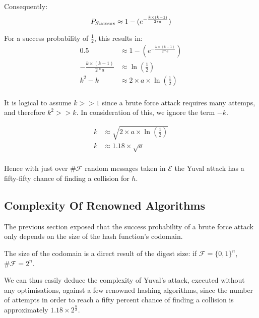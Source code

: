 Consequently:
\begin{equation}
  P_{Success} \approx 1 - (e^{-\frac{k\times (k-1)}{2*a}}) \\
\end{equation}

For a success probability of $\frac{1}{2}$, this results in:
\begin{equation}
  \begin{aligned}
  0.5 & \approx 1 - (e^{-\frac{k\times (k-1)}{2*a}}) \\
  -\frac{k\times (k-1)}{2*a} & \approx \ln(\frac{1}{2}) \\
  k^2 -k & \approx 2 \times a \times \ln(\frac{1}{2}) \\
  \end{aligned}
\end{equation}

It is logical to assume $k>>1$ since a brute force attack requires many attemps, and therefore $k^2>>k$. In consideration of this, we ignore the term $-k$.

\begin{equation}
  \begin{aligned}
  k & \approx \sqrt{2 \times a \times \ln(\frac{1}{2})} \\
  k & \approx 1.18 \times \sqrt{a}\\
  \end{aligned}
\end{equation}

Hence with just over $\#  \mathcal{F} $ random messages taken in $\mathcal{E}$ the Yuval attack has a fifty-fifty chance of finding a collision for $h$.

\subsection{Complexity Of Renowned Algorithms}
The previous section exposed that the success probability of a brute force attack only depends on the size of the hash function's codomain.

The size of the codomain is a direct result of the digest size: if $\mathcal{F} = {\{ 0,1\}}^n$, $\#  \mathcal{F} = 2^n$.

We can thus easily deduce the complexity of Yuval's attack, executed without any optimisations, against a few renowned hashing algorithms, since the number of attempts in order to reach a fifty percent chance of finding a collision is approximately $1.18 \times 2^{\frac{n}{2}}$.


